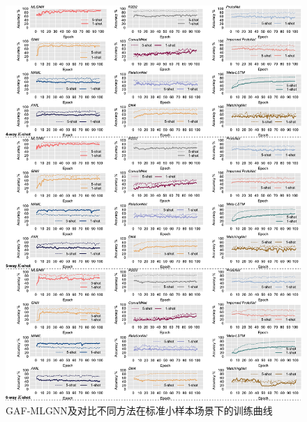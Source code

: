 \begin{figure}[h]
    \centering
    \includegraphics[width=\linewidth]{figures/curves_chap4.pdf}
    \caption{GAF-MLGNN及对比不同方法在标准小样本场景下的训练曲线}
    \label{fig:curves}
\end{figure}

